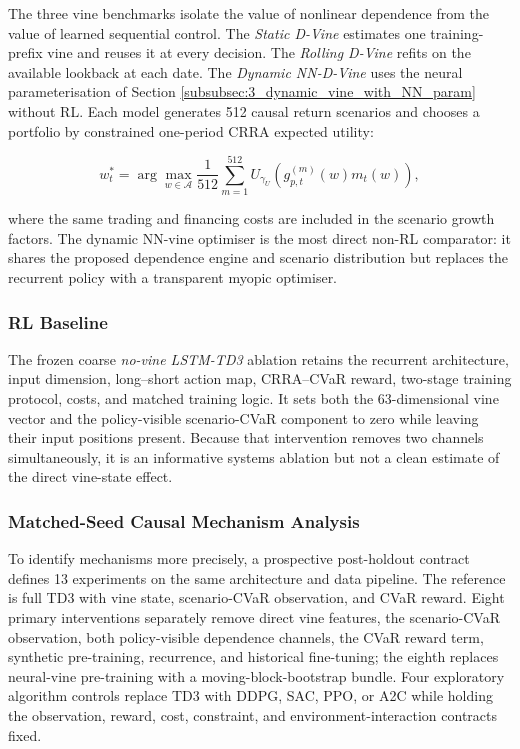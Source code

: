 The three vine benchmarks isolate the value of nonlinear dependence from the value of learned sequential control. The \textit{Static D-Vine} estimates one training-prefix vine and reuses it at every decision. The \textit{Rolling D-Vine} refits on the available lookback at each date. The \textit{Dynamic NN-D-Vine} uses the neural parameterisation of Section \ref{subsubsec:3_dynamic_vine_with_NN_param} without RL. Each model generates 512 causal return scenarios and chooses a portfolio by constrained one-period CRRA expected utility:

\begin{equation}
w_t^*=\arg\max_{w\in\mathcal A}\frac{1}{512}\sum_{m=1}^{512}
U_{\gamma_U}\!\left(g_{p,t}^{(m)}(w)m_t(w)\right),
\label{eq:myopic_eu}
\end{equation}

where the same trading and financing costs are included in the scenario growth factors. The dynamic NN-vine optimiser is the most direct non-RL comparator: it shares the proposed dependence engine and scenario distribution but replaces the recurrent policy with a transparent myopic optimiser.

\subsubsection{RL Baseline}
\label{subsubsec:3_rl_baseline}

The frozen coarse \textit{no-vine LSTM-TD3} ablation retains the recurrent architecture, input dimension, long--short action map, CRRA--CVaR reward, two-stage training protocol, costs, and matched training logic. It sets both the 63-dimensional vine vector and the policy-visible scenario-CVaR component to zero while leaving their input positions present. Because that intervention removes two channels simultaneously, it is an informative systems ablation but not a clean estimate of the direct vine-state effect.

\subsubsection{Matched-Seed Causal Mechanism Analysis}
\label{subsubsec:3_causal_analysis}

To identify mechanisms more precisely, a prospective post-holdout contract defines 13 experiments on the same architecture and data pipeline. The reference is full TD3 with vine state, scenario-CVaR observation, and CVaR reward. Eight primary interventions separately remove direct vine features, the scenario-CVaR observation, both policy-visible dependence channels, the CVaR reward term, synthetic pre-training, recurrence, and historical fine-tuning; the eighth replaces neural-vine pre-training with a moving-block-bootstrap bundle. Four exploratory algorithm controls replace TD3 with DDPG, SAC, PPO, or A2C while holding the observation, reward, cost, constraint, and environment-interaction contracts fixed.


